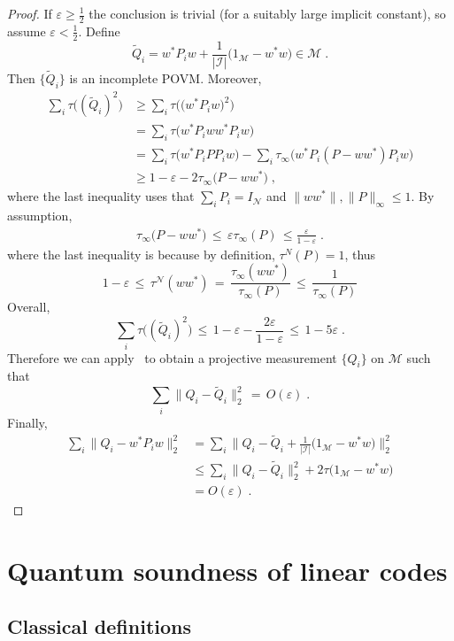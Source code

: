 \documentclass[11pt]{article}
\theoremstyle{definition}
\newcommand{\Id}{\ensuremath{I}}
\newcommand{\mM}{\ensuremath{\mathcal{M}}}
\newcommand{\mI}{\ensuremath{\mathcal{I}}}
\newcommand{\eps}{\varepsilon}
\newcommand{\mN}{\mathcal{N}}
\begin{document}
\begin{proof}
If $\eps\geq \frac{1}{2}$ the conclusion is trivial (for a suitably large implicit constant), so assume $\eps<\frac{1}{2}$. 
Define 
\[\tilde{Q}_i = w^* P_i w  + \frac{1}{|\mI|}\big(1_\mM - w^* w\big) \in \mM\;.\]
Then $\{\tilde{Q}_i\}$ is an incomplete POVM. Moreover, 
\begin{align*}
\sum_{i} \tau\big( (\tilde{Q}_i)^2 \big) &\geq \sum_{i} \tau\big( \big(w^* P_i w \big)^2 \big) \\
&= \sum_{i} \tau\big(  w^* P_i w w^*P_i w \big)\\
&= \sum_i \tau\big(  w^* P_i  P P_i w \big) - \sum_i \tau_\infty\big( w^* P_i  ( P - w w^*) P_i w \big)\\
&\geq 1 - \eps -  2\tau_\infty\big( P- w w^*\big)\;,
\end{align*}
where the last inequality uses that $\sum_i P_i = \Id_\mN$ and $\|ww^*\|,\|P\|_\infty\leq 1$. By assumption, 
\begin{align*}
\tau_\infty\big( P- w w^*\big) \,\leq\, \eps \tau_\infty(P)\,\leq \frac{\eps}{1-\eps}\;.
\end{align*}
where the last inequality is because by definition, $\tau^N(P)=1$, thus
\[1-\eps \,\leq\, \tau^\mN(ww^*) \,=\, \frac{\tau_\infty(ww^*)}{\tau_\infty(P)} \,\leq\, \frac{1}{\tau_\infty(P)}\]
Overall, 
\[ \sum_{i} \tau\big( (\tilde{Q}_i)^2 \big) \,\leq\, 1-\eps-\frac{2\eps}{1-\eps}\,\leq\, 1-5\eps\;.\]
Therefore we can apply~\cite[Theorem 1.2]{de2021orthogonalization} to obtain a projective measurement $\{Q_i\}$ on $\mM$ such that 
\begin{equation*}
\sum_i \big\|{Q}_i - \tilde{Q}_i \big\|^2_2 \,=\, O(\eps)\;.
\end{equation*}
Finally,
\begin{align*}
\sum_i \big\|{Q}_i - w^*{P}_i w\big\|^2_2 &= \sum_i \big\|{Q}_i - \tilde{Q}_i  + \frac{1}{|\mI|}\big(1_\mM - w^* w\big) \big\|^2_2\\
&\leq  \sum_i \big\|{Q}_i - \tilde{Q}_i\big\|_2^2  + 2\tau\big(1_\mM - w^* w\big) \\
&=  O(\eps)\;.
\end{align*}
\end{proof}
	
	
\section{Quantum soundness of linear codes}

\subsection{Classical definitions}
\end{document}
